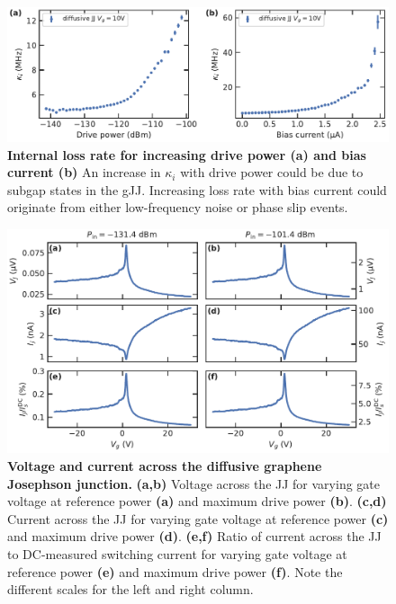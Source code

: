\begin{figure}[p]
	\centering
	\includegraphics[width=\linewidth]{chapter-gJJ-CPR/figs/SMFigure-lossrates}
	\caption{
		\textbf{Internal loss rate for increasing drive power (a) and bias current (b)}
		An increase in $\kappa_i$ with drive power could be due to subgap states in the gJJ.
		Increasing loss rate with bias current could originate from either low-frequency noise or phase slip events.
	}
	\label{fig:SMFig-lossrates}
\end{figure}

\begin{figure}
	\centering
	\includegraphics[width=\linewidth]{chapter-gJJ-CPR/figs/SMFigure-poweratJJ}
	\caption{
		\textbf{Voltage and current across the diffusive graphene Josephson junction.}
		\textbf{(a,b)} Voltage across the JJ for varying gate voltage at reference power \textbf{(a)} and maximum drive power \textbf{(b)}.
		\textbf{(c,d)} Current across the JJ for varying gate voltage at reference power \textbf{(c)} and maximum drive power \textbf{(d)}.
		\textbf{(e,f)} Ratio of current across the JJ to DC-measured switching current for varying gate voltage at reference power \textbf{(e)} and maximum drive power \textbf{(f)}.
		Note the different scales for the left and right column.
	}
	\label{fig:SMFigpoweratJJ}
\end{figure}


